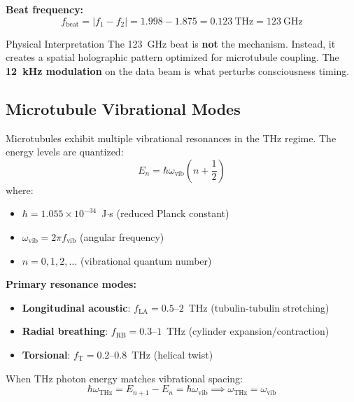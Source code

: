 \textbf{Beat frequency:}
\begin{equation}
f_{\text{beat}} = |f_1 - f_2| = 1.998 - 1.875 = 0.123~\text{THz} = 123~\text{GHz}
\label{eq:beat-freq}
\end{equation}

\begin{calloutbox}{Physical Interpretation}
The 123~GHz beat is \textbf{not} the mechanism. Instead, it creates a spatial holographic pattern optimized for microtubule coupling. The \textbf{12~kHz modulation} on the data beam is what perturbs consciousness timing.
\end{calloutbox}

\subsection{Microtubule Vibrational Modes}

Microtubules exhibit multiple vibrational resonances in the THz regime. The energy levels are quantized:
\begin{equation}
E_n = \hbar\omega_{\text{vib}}\left(n + \frac{1}{2}\right)
\label{eq:vibrational-energy}
\end{equation}
where:
\begin{itemize}
\item $\hbar = 1.055 \times 10^{-34}$~J$\cdot$s (reduced Planck constant)
\item $\omega_{\text{vib}} = 2\pi f_{\text{vib}}$ (angular frequency)
\item $n = 0, 1, 2, \ldots$ (vibrational quantum number)
\end{itemize}

\textbf{Primary resonance modes:}
\begin{itemize}
\item \textbf{Longitudinal acoustic}: $f_{\text{LA}} = 0.5$--$2$~THz (tubulin-tubulin stretching)
\item \textbf{Radial breathing}: $f_{\text{RB}} = 0.3$--$1$~THz (cylinder expansion/contraction)
\item \textbf{Torsional}: $f_{\text{T}} = 0.2$--$0.8$~THz (helical twist)
\end{itemize}

When THz photon energy matches vibrational spacing:
\begin{equation}
\hbar\omega_{\text{THz}} = E_{n+1} - E_n = \hbar\omega_{\text{vib}} \implies \omega_{\text{THz}} = \omega_{\text{vib}}
\label{eq:resonance-condition}
\end{equation}

